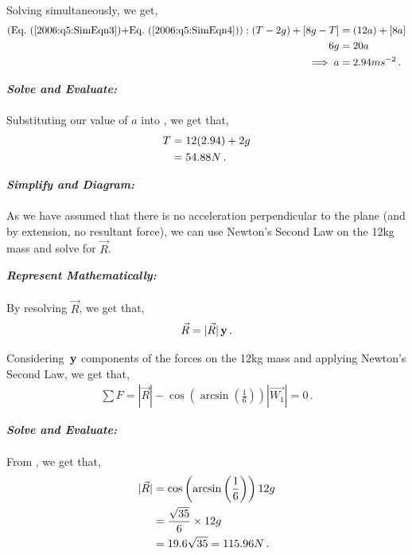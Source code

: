 \begin{subquestions}
\begin{subsubquestions}
	Solving  simultaneously, we get,
	\begin{align}
		(\text{\req{2006:q5:SimEqn3}+\req{2006:q5:SimEqn4}}): (T-2g)+[8g-T] & = (12a)+[8a] \nn \\
		6g & = 20a \nn \\
		\implies a & = 2.94ms^{-2}\,.
	\end{align} 
	
	
	\subsubquestion
	
	\textbf{\textit{Solve and Evaluate:}} \\ \\
	Substituting our value of $a$ into , we get that,
	\begin{align}
		T & = 12(2.94) + 2g \nonumber \\
		  & = 54.88N \,.
	\end{align}
	
	
	\subsubquestion
	
	\textbf{\textit{Simplify and Diagram:}} \\ \\
	As we have assumed that there is no acceleration perpendicular to the plane (and by extension, no resultant force), we can use Newton's Second Law on the 12kg mass and solve for $\vec{R}$.
	
	
	
	
	\textbf{\textit{Represent Mathematically:}} \\ \\
	By resolving $\vec{R}$, we get that,
	\begin{equation}
		\vec{R} = |\vec{R}|\,\mathbf{y} \,.
	\end{equation}  
	
	Considering  $\,\mathbf{y}$ components of the forces on the 12kg mass and applying Newton's Second Law, we get that,
	\begin{align}
		\sum F = |\vec{R}|-\cos\left(\arcsin\left(\frac{1}{6}\right)\right)|\vec{W_1}| = 0 \label{2006:q5:REqn1}\,.
	\end{align}
	
	
	
	
	\textbf{\textit{Solve and Evaluate:}} \\ \\
	From , we get that,
	\begin{align}
		|\vec{R}| & = \cos\left(\arcsin\left(\frac{1}{6}\right)\right)12g \nonumber \\
		          & = \frac{\sqrt{35}}{6}\times 12g \nonumber \\
		          & = 19.6\sqrt{35} = 115.96N \,. 
	\end{align}
	

\end{subsubquestions}
\end{subquestions}
